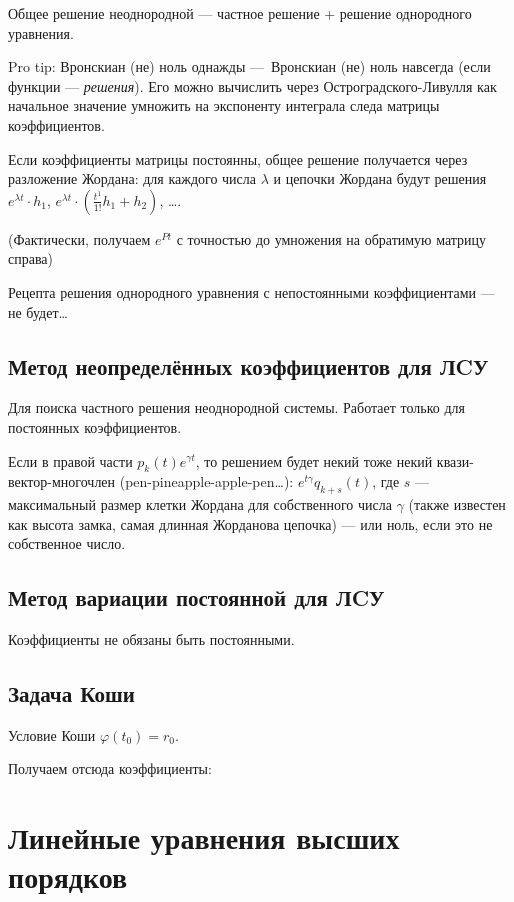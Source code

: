 \documentclass[12pt, a4paper]{article}
\begin{document}
Общее решение неоднородной — частное решение + решение однородного уравнения.

Pro tip: Вронскиан (не) ноль однажды — Вронскиан (не) ноль навсегда (если функции — \textit{решения}).
Его можно вычислить через Остроградского-Ливулля как начальное значение умножить на экспоненту интеграла следа матрицы коэффициентов.

Если коэффициенты матрицы постоянны, общее решение получается через разложение Жордана: для каждого числа $\lambda$ и цепочки Жордана будут решения
$e^{\lambda t} \cdot h_1$, $e^{\lambda t} \cdot (\frac{t^{1}}{1!} h_1 + h_2)$, ….

(Фактически, получаем $e^{Pt}$ с точностью до умножения на обратимую матрицу справа)

Рецепта решения однородного уравнения с непостоянными коэффициентами — не будет…

\subsection{Метод неопределённых коэффициентов для ЛCУ}

Для поиска частного решения неоднородной системы.
Работает только для постоянных коэффициентов.

Если в правой части $p_k(t) e^{\gamma t}$, 
то решением будет некий тоже некий квази-вектор-многочлен (pen-pineapple-apple-pen…): 
$e^{t\gamma}q_{k + s}(t)$, где $s$ — максимальный 
размер клетки Жордана для собственного числа $\gamma$ (также известен как высота замка, 
самая длинная Жорданова цепочка)
— или ноль, если это не собственное число.

\subsection{Метод вариации постоянной для ЛCУ}

Коэффициенты не обязаны быть постоянными.


\subsection{Задача Коши}

Условие Коши $\varphi(t_0) = r_0$.

Получаем отсюда коэффициенты:



\section{Линейные уравнения высших порядков}
\end{document}
